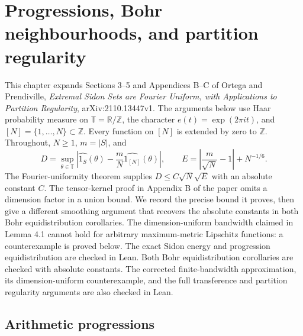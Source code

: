 \chapter{Progressions, Bohr neighbourhoods, and partition regularity}
\label{app:chapter}

This chapter expands Sections 3--5 and Appendices B--C of Ortega and
Prendiville, \emph{Extremal Sidon Sets are Fourier Uniform, with Applications
to Partition Regularity}, arXiv:2110.13447v1.  The arguments below use Haar
probability measure on $\mathbb T=\mathbb R/\mathbb Z$, the character
$e(t)=\exp(2\pi i t)$, and $[N]=\{1,\ldots,N\}\subset\mathbb Z$.
Every function on $[N]$ is extended by zero to $\mathbb Z$.  Throughout,
$N\geq1$, $m=|S|$, and
\[
 D=\sup_{\theta\in\mathbb T}
 \left|\widehat{1_S}(\theta)-\frac mN\widehat{1_{[N]}}(\theta)\right|,
 \qquad E=\left|\frac m{\sqrt N}-1\right|+N^{-1/6}.
\]
The Fourier-uniformity theorem supplies $D\leq C\sqrt N\sqrt E$ with an
absolute constant $C$.  The tensor-kernel proof in Appendix B of the paper
omits a dimension factor in a union bound.  We record the precise bound
it proves, then give a different smoothing argument that recovers the
absolute constants in both Bohr equidistribution corollaries.
The dimension-uniform bandwidth claimed in Lemma 4.1 cannot hold for
arbitrary maximum-metric Lipschitz functions: a counterexample is proved
below.  The exact Sidon energy and progression equidistribution are checked
in Lean.  Both Bohr equidistribution corollaries are checked with absolute
constants.  The corrected finite-bandwidth approximation, its
dimension-uniform counterexample, and the full transference and partition
regularity arguments are also checked in Lean.

\section{Arithmetic progressions}

